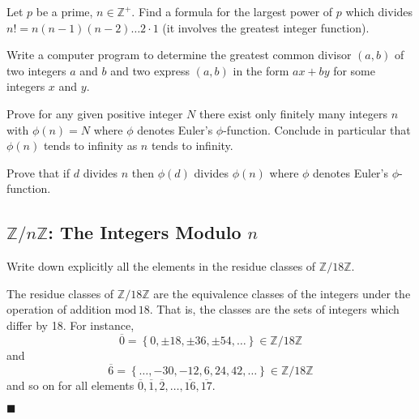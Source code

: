 \documentclass[12pt]{article}
\renewcommand{\qed}{\hfill$\blacksquare$}
\renewenvironment{proof}{\begin{addmargin}[1em]{0em}\begin{newproof}}{\end{newproof}\end{addmargin}\qed}
\newenvironment{problem}[2][Exercise]{\begin{trivlist}
\item[\hskip \labelsep {\bfseries #1}\hskip \labelsep {\bfseries #2.}]}{\end{trivlist}}
\begin{document}
\begin{problem}{0.2.8}
Let $p$ be a prime, $n\in \mathbb{Z}^+$. Find a formula for the largest power of $p$ which divides $n!=n\left(n-1\right)\left(n-2\right)\ldots 2\cdot 1$ (it involves the greatest integer function).
\end{problem}


\begin{problem}{0.2.9}
Write a computer program to determine the greatest common divisor $\left(a,b\right)$ of two integers $a$ and $b$ and two express $\left(a,b\right)$ in the form $ax+by$ for some integers $x$ and $y$.
\end{problem}


\begin{problem}{0.2.10}
Prove for any given positive integer $N$ there exist only finitely many integers $n$ with $\phi \left(n\right)=N$ where $\phi$ denotes Euler's $\phi$-function. Conclude in particular that $\phi\left(n\right)$ tends to infinity as $n$ tends to infinity.
\end{problem}


\begin{problem}{0.2.11}
Prove that if $d$ divides $n$ then $\phi\left(d\right)$ divides $\phi\left(n\right)$ where $\phi$ denotes Euler's $\phi$-function.
\end{problem}






\subsection*{$\mathbb{Z}/n\mathbb{Z}$: The Integers Modulo $n$}

\begin{problem}{0.3.1}
Write down explicitly all the elements in the residue classes of $\mathbb{Z}/18\mathbb{Z}$.
\end{problem}

\begin{proof}
The residue classes of $\mathbb{Z}/18\mathbb{Z}$ are the equivalence classes of the integers under the operation of addition $\text{mod}\, 18$. That is, the classes are the sets of integers which differ by 18. For instance,
$$ \overline{0} = \left\{ 0,\pm 18, \pm 36, \pm 54,\ldots \right\} \in \mathbb{Z}/18\mathbb{Z} $$
and
$$ \overline{6} = \left\{ \ldots,-30,-12, 6, 24, 42, \ldots \right\} \in \mathbb{Z}/18\mathbb{Z} $$
and so on for all elements $\overline{0},\overline{1},\overline{2},\ldots,\overline{16},\overline{17}$.
\end{proof}
\end{document}
